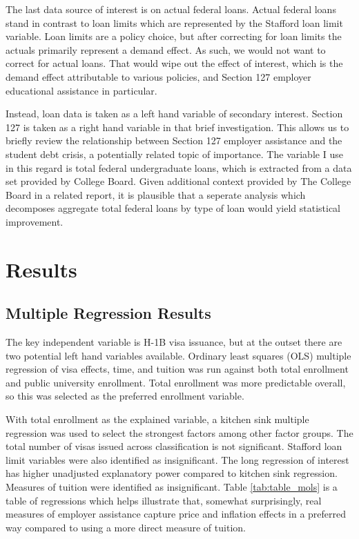 \documentclass[review]{elsarticle}
\begin{document}
The last data source of interest is on actual federal loans.
Actual federal loans stand in contrast to loan limits which are represented by the Stafford loan limit variable.
Loan limits are a policy choice, but after correcting for loan limits the actuals primarily represent a demand effect.
As such, we would not want to correct for actual loans.
That would wipe out the effect of interest,
which is the demand effect attributable to various policies,
and Section 127 employer educational assistance in particular.

Instead, loan data is taken as a left hand variable of secondary interest.
Section 127 is taken as a right hand variable in that brief investigation.
This allows us to briefly review the relationship between Section 127 employer assistance
and the student debt crisis, a potentially related topic of importance.
The variable I use in this regard is total federal undergraduate loans,
which is extracted from a data set provided by College Board\cite{cb_excel_2019}.
Given additional context provided by The College Board in a related report\cite{cb_trends_2019},
it is plausible that a seperate analysis which decomposes aggregate total federal loans by type of loan would yield statistical improvement.

\section{Results}

\subsection{Multiple Regression Results}
The key independent variable is H-1B visa issuance, but at the outset there are two potential left hand variables available.
Ordinary least squares (OLS) multiple regression of visa effects, time, and tuition was run against both total enrollment and public university enrollment.
Total enrollment was more predictable overall, so this was selected as the preferred enrollment variable.

With total enrollment as the explained variable,
a kitchen sink multiple regression was used to select the strongest factors among other factor groups.
The total number of visas issued across classification is not significant.
Stafford loan limit variables were also identified as insignificant.
The long regression of interest has higher unadjusted explanatory power compared to kitchen sink regression.
Measures of tuition were identified as insignificant.
Table \ref{tab:table_mols} is a table of regressions which helps illustrate that, somewhat surprisingly,
real measures of employer assistance capture price and inflation effects in a preferred way
compared to using a more direct measure of tuition.
\end{document}
